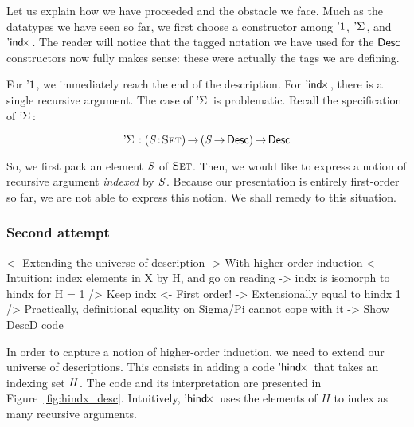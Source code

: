 Let us explain how we have proceeded and the obstacle we face. Much as
the datatypes we have seen so far, we first choose a constructor among
$\DUnit$, $\DSigma{\!}{\!}$, and $\DIndx{\!}$. The reader will notice
that the tagged notation we have used for the $\Desc$ constructors now
fully makes sense: these were actually the tags we are defining.

For $\DUnit$, we immediately reach the end of the description. For
$\DIndx{\!}$, there is a single recursive argument. The case of
$\DSigma{\!}{\!}$ is problematic. Recall the specification of
$\DSigma{\!}{\!}$:

\[    \DSigma{\!}{\!} : \PI{\V{S}}{\Set} \PIS{\V{S} \To \Desc} \Desc      \]

So, we first pack an element $\V{S}$ of $\Set$. Then, we would like to
express a notion of recursive argument \emph{indexed} by $\V{S}$. Because
our presentation is entirely first-order so far, we are not able to
express this notion. We shall remedy to this situation.


\subsubsection{Second attempt}

\begin{wstructure}
<- Extending the universe of description
    -> With higher-order induction
    <- Intuition: index elements in X by H, and go on reading
        -> indx is isomorph to hindx for H = 1
    /> Keep indx
        <- First order!
        -> Extensionally equal to hindx 1
        /> Practically, definitional equality on Sigma/Pi cannot cope with it
    -> Show DescD code
\end{wstructure}

In order to capture a notion of higher-order induction, we need to
extend our universe of descriptions. This consists in adding a code
$\DHindx{\!}{\!}$ that takes an indexing set $\V{H}$. The code and its
interpretation are presented in
Figure~\ref{fig:hindx_desc}. Intuitively, $\DHindx{\!}{\!}$ uses the
elements of $H$ to index as many recursive arguments.

